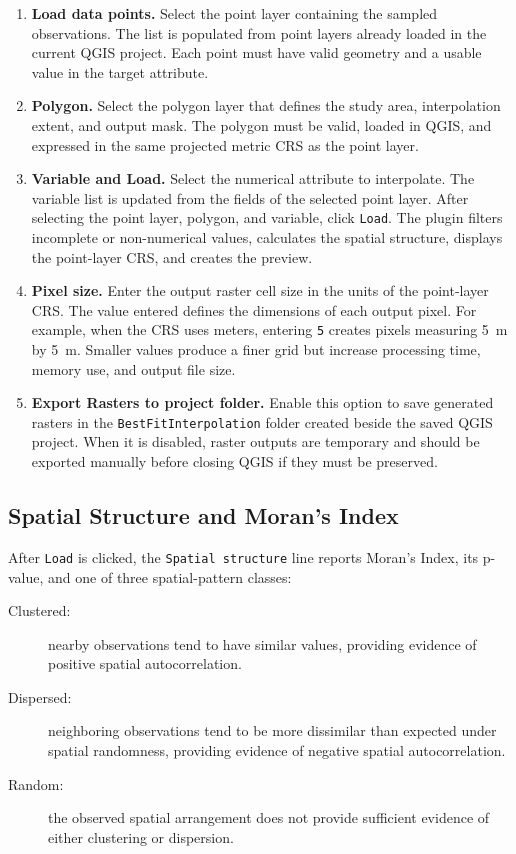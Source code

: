 \documentclass[11pt,a4paper]{article}
\begin{document}
\begin{enumerate}
    \item \textbf{Load data points.} Select the point layer containing the sampled observations. The list is populated from point layers already loaded in the current QGIS project. Each point must have valid geometry and a usable value in the target attribute.

    \item \textbf{Polygon.} Select the polygon layer that defines the study area, interpolation extent, and output mask. The polygon must be valid, loaded in QGIS, and expressed in the same projected metric CRS as the point layer.

    \item \textbf{Variable and Load.} Select the numerical attribute to interpolate. The variable list is updated from the fields of the selected point layer. After selecting the point layer, polygon, and variable, click \texttt{Load}. The plugin filters incomplete or non-numerical values, calculates the spatial structure, displays the point-layer CRS, and creates the preview.

    \item \textbf{Pixel size.} Enter the output raster cell size in the units of the point-layer CRS. The value entered defines the dimensions of each output pixel. For example, when the CRS uses meters, entering \texttt{5} creates pixels measuring 5~m by 5~m. Smaller values produce a finer grid but increase processing time, memory use, and output file size.

    \item \textbf{Export Rasters to project folder.} Enable this option to save generated rasters in the \texttt{BestFitInterpolation} folder created beside the saved QGIS project. When it is disabled, raster outputs are temporary and should be exported manually before closing QGIS if they must be preserved.
\end{enumerate}

\subsection{Spatial Structure and Moran's Index}

After \texttt{Load} is clicked, the \texttt{Spatial structure} line reports Moran's Index, its p-value, and one of three spatial-pattern classes:

\begin{description}
    \item[Clustered:] nearby observations tend to have similar values, providing evidence of positive spatial autocorrelation.
    \item[Dispersed:] neighboring observations tend to be more dissimilar than expected under spatial randomness, providing evidence of negative spatial autocorrelation.
    \item[Random:] the observed spatial arrangement does not provide sufficient evidence of either clustering or dispersion.
\end{description}
\end{document}
